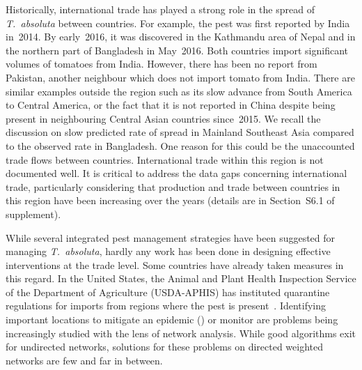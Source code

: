 \documentclass[11pt]{article}
\newcommand{\tuta}{\emph{T.~absoluta}}
\theoremstyle{definition}
\begin{document}
Historically, international trade has played a strong role in the spread of
\tuta{} between countries. For example, the pest was first reported by
India in~2014. By early~2016, it was discovered in the Kathmandu area of
Nepal and in the northern part of Bangladesh in May~2016. Both countries import
significant volumes of tomatoes from India. However, there has been no report
from Pakistan, another neighbour which does not import tomato from India.
There are similar examples outside the region such as its slow advance from
South America to Central America, or the fact that it is not reported in
China despite being present in neighbouring Central Asian countries
since~2015.  We recall the discussion on slow predicted rate of spread in
Mainland Southeast Asia compared to the observed rate in Bangladesh. One
reason for this could be the unaccounted trade flows between countries.
International trade within this region is not documented well.  It is
critical to address the data gaps concerning international trade,
particularly considering that production and trade between countries in
this region have been increasing over the years (details are in
Section~S6.1 of supplement).

While several integrated pest management strategies have been suggested for
managing \tuta{}, hardly any work has been done in designing effective
interventions at the trade level. Some countries have already taken
measures in this regard. In the United States, the Animal and Plant Health
Inspection Service of the Department of Agriculture (USDA-APHIS) has
instituted quarantine regulations for imports from regions where the pest
is present~\cite{USDA2012}. Identifying important locations to mitigate an
epidemic (\cite{banks2015role,kiss2006network,pautasso2010disease}) or
monitor are problems being increasingly studied with the lens of network
analysis.  While good algorithms exit for undirected networks, solutions
for these problems on directed weighted networks are few and far in
between.


\end{document}
